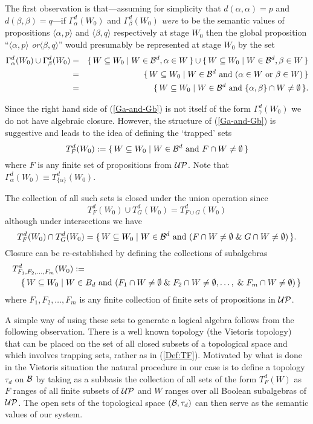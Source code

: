 \documentclass[12pt]{article}
\newcounter{def-number}[section]
\newcommand{\beq}{\begin{equation}}
\newcommand{\eeq}{\end{equation}}
\newcommand{\beqa}{\begin{eqnarray}}
\newcommand{\eeqa}{\end{eqnarray}}
\newcommand{\aand}{\mbox{ and }}
\newcommand{\oor}{\mbox{ or }}
\newcommand{\eq}[1]{(\ref{#1})}
\renewcommand{\a}{\alpha}                   %
\renewcommand{\b}{\beta}                    %
\newcommand{\g}{\gamma}
\newcommand{\gp}[2]{\langle#1,#2\rangle}
\newcommand{\B}{{\cal B}}
\newcommand{\Bd}{{\cal B}^d}
\newcommand{\G}{\Gamma}
\newcommand{\UP}{{\cal UP}}
\begin{document}
	The first observation is that---assuming for simplicity that
$d(\a,\a)=p$ and $d(\b,\b)=q$---if $\G^d_\a(W_0)$ and $\G^d_\b(W_0)$
{\em were\/} to be the semantic values of propositions $\gp{\a}{p}$
and $\gp{\b}{q}$ respectively at stage $W_0$ then the global
proposition ``$\gp{\a}{p}$ {\em or\/}$\gp{\b}{q}$'' would presumably
be represented at stage $W_0$ by the set
\beqa
	\G^d_\a(W_0)\cup \G^d_\b(W_0)&=&
		\{\,W\subseteq W_0\mid W\in\Bd, \a\in W\,\}\cup
			\{\,W\subseteq W_0\mid W\in\Bd, \b\in W\,\}\nonumber\\
	&=&\{\,W\subseteq W_0\mid W\in\Bd 
				\aand(\a\in W \oor \b\in W)\,\}	\nonumber\\
	&=&\{\,W\subseteq W_0\mid W\in\Bd\aand\{\a,\b\}\cap W\neq\emptyset\,\}.
									\label{Ga-and-Gb}
\eeqa

	Since the right hand side of \eq{Ga-and-Gb} is not itself of the form
$\G^d_\g(W_0)$ we do not have algebraic closure. However, the
structure of \eq{Ga-and-Gb} is suggestive and leads to the idea of
defining the `trapped' sets
\beq
		T^d_F(W_0):=\{\,W\subseteq W_0\mid W\in\Bd\aand F\cap
					W\neq\emptyset\,\}				\label{Def:TF}				
\eeq
where $F$ is any finite set of propositions from $\UP$. Note that
$\G^d_\a(W_0)\equiv T^d_{\{\a\}}(W_0)$. 

	The collection of all such sets is closed under the union
operation since
\beq
		T^d_F(W_0)\cup T^d_G(W_0)=T^d_{F\cup G}(W_0)
\eeq
although under intersections we have
\beq
	T^d_F(W_0)\cap T^d_G(W_0)=\{\,W\subseteq W_0\mid W\in\Bd\aand (F\cap
		W\neq\emptyset\;\&\; G\cap W\neq\emptyset)\,\}.
\eeq
Closure can be re-established by defining the collections of
subalgebras
\beqa
\lefteqn{T^d_{F_1,F_2,\ldots,F_m}(W_0) := }		\label{TFm}\\
		& & \{\,W\subseteq W_0\mid W\in B_d\aand
				(F_1\cap W\neq\emptyset\;\&\; F_2\cap W\neq\emptyset,
			\ldots,\;\&\; F_m\cap W\neq\emptyset)\,\}\nonumber
\eeqa
where $F_1,F_2,\ldots,F_m$ is any finite collection of finite sets
of propositions in $\UP$. 

	A simple way of using these sets to generate a logical algebra
follows from the following observation. There is a well known
topology (the Vietoris topology) that can be placed on the set of
all closed subsets of a topological space and which involves
trapping sets, rather as in \eq{Def:TF}. Motivated by what is done
in the Vietoris situation the natural procedure in our case is to
define a topology $\tau_d$ on $\B$ by taking as a subbasis the
collection of all sets of the form $T^d_F(W)$ as $F$ ranges of all
finite subsets of $\UP$ and $W$ ranges over all Boolean
subalgebras of $\UP$. The open sets of the topological space
$(\B,\tau_d)$ can then serve as the semantic values of our system.
\end{document}
